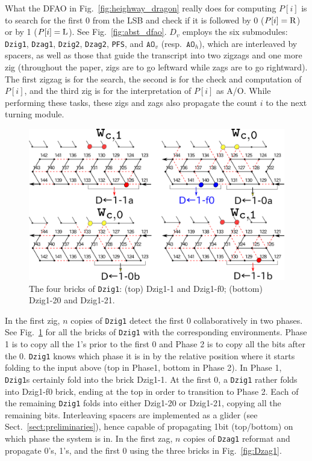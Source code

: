 \documentclass[dvipdfmx,review]{elsarticle}
\begin{document}
What the DFAO in Fig.~\ref{fig:heighway_dragon} really does for computing $P[i]$ is to search for the first 0 from the LSB and check if it is followed by 0 ($P[i] = {\rm R}$) or by 1 ($P[i] = {\rm L}$). 
See Fig.~\ref{fig:abst_dfao}. 
$D_v$ employs the six submodules: {\tt Dzig1}, \texttt{Dzag1}, \texttt{Dzig2}, \texttt{Dzag2}, \texttt{PFS}, and $\mathtt{AO}_v$ (resp.~$\mathtt{AO}_h$), which are interleaved by spacers, as well as those that guide the transcript into two zigzags and one more zig (throughout the paper, zigs are to go leftward while zags are to go rightward). 
The first zigzag is for the search, the second is for the check and computation of $P[i]$, and the third zig is for the interpretation of $P[i]$ as A/O. 
While performing these tasks, these zigs and zags also propagate the count $i$ to the next turning module. 

\begin{figure}[h]

\centering
\includegraphics[width=\linewidth]{Figs/DFAO-zig1.png}  
\caption{The four bricks of \texttt{Dzig1}: (top) Dzig1-1 and Dzig1-f0; (bottom) Dzig1-20 and Dzig1-21.}
\label{fig:DFAO-zig1}
\end{figure}

In the first zig, $n$ copies of \texttt{Dzig1} detect the first 0 collaboratively in two phases. 
See Fig.~\ref{fig:DFAO-zig1} for all the bricks of \texttt{Dzig1} with the corresponding environments. 
Phase 1 is to copy all the 1's prior to the first 0 and Phase 2 is to copy all the bits after the 0. 
\texttt{Dzig1} knows which phase it is in by the relative position where it starts folding to the input above (top in Phase1, bottom in Phase 2). 
In Phase 1, \texttt{Dzig1}s certainly fold into the brick Dzig1-1. 
At the first 0, a \texttt{Dzig1} rather folds into Dzig1-f0 brick, ending at the top in order to transition to Phase 2. 
Each of the remaining \texttt{Dzig1} folds into either Dzig1-20 or Dzig1-21, copying all the remaining bits. 
Interleaving spacers are implemented as a glider (see Sect.~\ref{sect:preliminaries}), hence capable of propagating 1bit (top/bottom) on which phase the system is in. 
In the first zag, $n$ copies of \texttt{Dzag1} reformat and propagate 0's, 1's, and the first 0 using the three bricks in Fig.~\ref{fig:Dzag1}.
\end{document}
